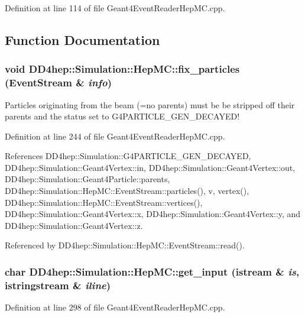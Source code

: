 Definition at line 114 of file Geant4EventReaderHepMC.cpp.

\subsection{Function Documentation}
\hypertarget{namespace_d_d4hep_1_1_simulation_1_1_hep_m_c_a07b61ea67e59ff0e064a976336f7f3f3}{
\subsubsection[{fix\_\-particles}]{\setlength{\rightskip}{0pt plus 5cm}void DD4hep::Simulation::HepMC::fix\_\-particles (EventStream \& {\em info})}}
\label{namespace_d_d4hep_1_1_simulation_1_1_hep_m_c_a07b61ea67e59ff0e064a976336f7f3f3}


Particles originating from the beam (=no parents) must be be stripped off their parents and the status set to G4PARTICLE\_\-GEN\_\-DECAYED! 

Definition at line 244 of file Geant4EventReaderHepMC.cpp.

References DD4hep::Simulation::G4PARTICLE\_\-GEN\_\-DECAYED, DD4hep::Simulation::Geant4Vertex::in, DD4hep::Simulation::Geant4Vertex::out, DD4hep::Simulation::Geant4Particle::parents, DD4hep::Simulation::HepMC::EventStream::particles(), v, vertex(), DD4hep::Simulation::HepMC::EventStream::vertices(), DD4hep::Simulation::Geant4Vertex::x, DD4hep::Simulation::Geant4Vertex::y, and DD4hep::Simulation::Geant4Vertex::z.

Referenced by DD4hep::Simulation::HepMC::EventStream::read().\hypertarget{namespace_d_d4hep_1_1_simulation_1_1_hep_m_c_ae12e8ca37b7071f67c1810fa9420acad}{
\subsubsection[{get\_\-input}]{\setlength{\rightskip}{0pt plus 5cm}char DD4hep::Simulation::HepMC::get\_\-input (istream \& {\em is}, \/  istringstream \& {\em iline})}}
\label{namespace_d_d4hep_1_1_simulation_1_1_hep_m_c_ae12e8ca37b7071f67c1810fa9420acad}


Definition at line 298 of file Geant4EventReaderHepMC.cpp.

